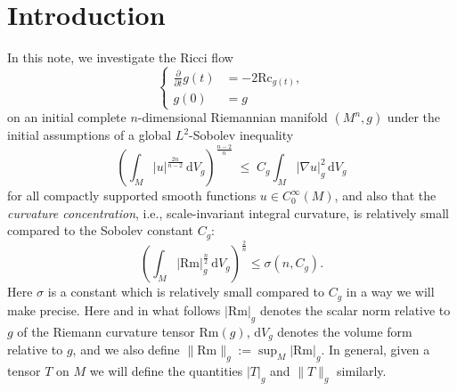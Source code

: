 \documentclass{amsart}
\theoremstyle{definition}
\newcommand{\Rm}{\mathrm{Rm}}
\newcommand{\dV}{\mathrm{d}V}
\begin{document}
\pagestyle{plain}

\vspace{-3em}


\section{Introduction}


In this note, we investigate the Ricci flow
\begin{equation}\label{RF}
                \left\{
                \begin{aligned}
                        \frac{{\partial }}{{\partial t}}g(t) &= -2 \text{Rc}_{g(t)}, \\
                        g(0) &= g
                \end{aligned}
                \right.
\end{equation}
on an initial complete $n$-dimensional Riemannian manifold $(M^n,g)$ under the initial assumptions of a global $L^2$-Sobolev inequality 
\begin{equation}\label{Sob}
    \left( \int_M |u|^{\frac{2n}{n-2}}\, \dV_g \right)^{\frac{n-2}{n}}
\;\le\;
C_g \int_M |\nabla u|_g^2\,\dV_g
\end{equation}
for all compactly supported smooth functions $u\in C^\infty_0(M)$, and also that the \textit{curvature concentration}, i.e., scale-invariant integral curvature, is relatively small compared to the Sobolev constant $C_g$:
\begin{equation}\label{CC}
    \left( \int_M | \Rm |_g^{\frac{n}{2}}\,\dV_g \right)^{\frac{2}{n}}
\le
\sigma(n,C_g).
\end{equation}
Here $\sigma$ is a constant which is relatively small compared to $C_g$ in a way we will make precise.  Here and in what follows $|\Rm|_g$ denotes the scalar norm relative to $g$ of the Riemann curvature tensor $\Rm(g)$, $\mathrm{d}V_g$ denotes the volume form relative to $g$, and we also define $\|\Rm\|_g := \sup_M |\Rm|_g$.  In general, given a tensor $T$ on $M$ we will define the quantities $|T|_g$ and $\|T\|_g$ similarly.
\end{document}
